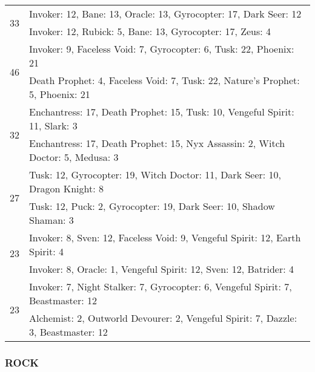\begin{table}[H]
\begin{tabular}{ | c | p{12.5cm} | }
\hline
\multirow{2}{*}{33}
& Invoker: 12, Bane: 13, Oracle: 13, Gyrocopter: 17, Dark Seer: 12 \\
& Invoker: 12, Rubick: 5, Bane: 13, Gyrocopter: 17, Zeus: 4 \\
\hline
\multirow{2}{*}{46}
& Invoker: 9, Faceless Void: 7, Gyrocopter: 6, Tusk: 22, Phoenix: 21 \\
& Death Prophet: 4, Faceless Void: 7, Tusk: 22, Nature's Prophet: 5, Phoenix: 21 \\
\hline
\multirow{2}{*}{32}
& Enchantress: 17, Death Prophet: 15, Tusk: 10, Vengeful Spirit: 11, Slark: 3 \\
& Enchantress: 17, Death Prophet: 15, Nyx Assassin: 2, Witch Doctor: 5, Medusa: 3 \\
\hline
\multirow{2}{*}{27}
& Tusk: 12, Gyrocopter: 19, Witch Doctor: 11, Dark Seer: 10, Dragon Knight: 8 \\
& Tusk: 12, Puck: 2, Gyrocopter: 19, Dark Seer: 10, Shadow Shaman: 3 \\
\hline
\multirow{2}{*}{23}
& Invoker: 8, Sven: 12, Faceless Void: 9, Vengeful Spirit: 12, Earth Spirit: 4 \\
& Invoker: 8, Oracle: 1, Vengeful Spirit: 12, Sven: 12, Batrider: 4 \\
\hline
\multirow{2}{*}{23}
& Invoker: 7, Night Stalker: 7, Gyrocopter: 6, Vengeful Spirit: 7, Beastmaster: 12 \\
& Alchemist: 2, Outworld Devourer: 2, Vengeful Spirit: 7, Dazzle: 3, Beastmaster: 12 \\
\hline
    \end{tabular}
    \caption{}
    \label{}
    \end{table}

\subsubsection*{ROCK}

